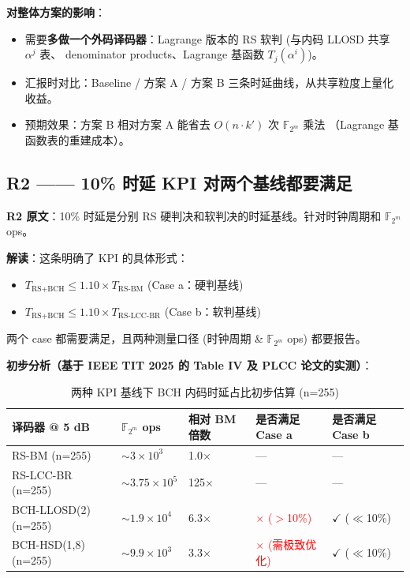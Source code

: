 \documentclass[11pt,a4paper]{article}
\begin{document}
\textbf{对整体方案的影响}：
\begin{itemize}[leftmargin=1.5em, itemsep=1pt]
\item 需要\textbf{多做一个外码译码器}：Lagrange 版本的 RS 软判 (与内码 LLOSD 共享 $\alpha^j$ 表、
denominator products、Lagrange 基函数 $T_j(\alpha^i)$)。
\item 汇报时对比：Baseline / 方案 A / 方案 B 三条时延曲线，从共享粒度上量化收益。
\item 预期效果：方案 B 相对方案 A 能省去 $O(n\cdot k')$ 次 $\mathbb{F}_{2^m}$ 乘法
（Lagrange 基函数表的重建成本）。
\end{itemize}

\subsection{R2 —— 10\% 时延 KPI 对两个基线都要满足}

\begin{quotebox}
\textbf{R2 原文}：10\% 时延是分别 RS 硬判决和软判决的时延基线。针对时钟周期和 $\mathbb{F}_{2^m}$ ops。
\end{quotebox}

\textbf{解读}：这条明确了 KPI 的具体形式：

\begin{keybox}[title=\textbf{硬性 KPI}]
\begin{itemize}[leftmargin=1.5em, itemsep=1pt, topsep=2pt]
\item $T_{\text{RS+BCH}} \leq 1.10 \times T_{\text{RS-BM}}$ \hfill (Case a：硬判基线)
\item $T_{\text{RS+BCH}} \leq 1.10 \times T_{\text{RS-LCC-BR}}$ \hfill (Case b：软判基线)
\end{itemize}
两个 case 都需要满足，且两种测量口径 (时钟周期 \& $\mathbb{F}_{2^m}$ ops) 都要报告。
\end{keybox}

\textbf{初步分析（基于 IEEE TIT 2025 的 Table IV 及 PLCC 论文的实测）}：

\begin{table}[!ht]
\centering
\begin{tabularx}{\textwidth}{Xllll}
\toprule
\textbf{译码器} @ 5 dB & \textbf{$\mathbb{F}_{2^m}$ ops} & \textbf{相对 BM 倍数} & \textbf{是否满足 Case a} & \textbf{是否满足 Case b} \\
\midrule
RS-BM (n=255)              & $\sim 3\times 10^3$   & 1.0$\times$  & --- & --- \\
RS-LCC-BR (n=255)          & $\sim 3.75\times 10^5$ & 125$\times$  & --- & --- \\
BCH-LLOSD(2) (n=255)       & $\sim 1.9\times 10^4$  & 6.3$\times$  & \textcolor{red}{$\times$ ($>$10\%)}  & \textcolor{accent3}{$\checkmark$ ($\ll$10\%)} \\
BCH-HSD(1,8) (n=255)       & $\sim 9.9\times 10^3$  & 3.3$\times$  & \textcolor{red}{$\times$ (需极致优化)} & \textcolor{accent3}{$\checkmark$ ($\ll$10\%)} \\
\bottomrule
\end{tabularx}
\caption{两种 KPI 基线下 BCH 内码时延占比初步估算 (n=255)}
\end{table}
\end{document}
